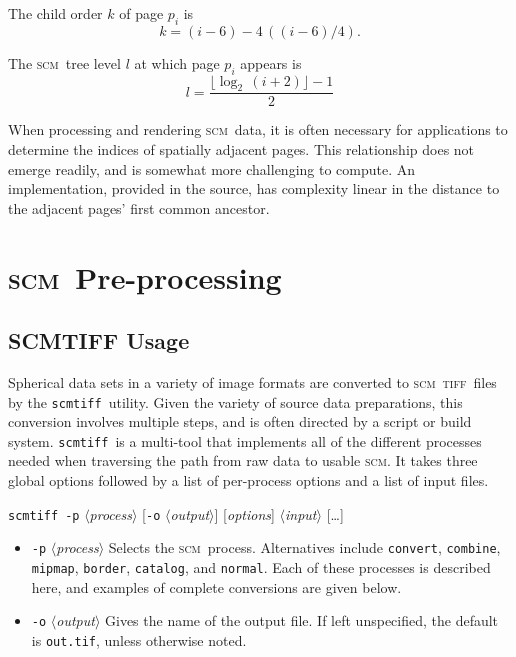 \documentclass[oneside,11pt]{memoir}
\newcommand{\scm}     {\textsc{scm}}
\newcommand{\tiff}    {\textsc{tiff}}
\newcommand{\scmtiff} {\texttt{scmtiff}}
\newcommand{\inangles}[1]{$\langle$#1$\rangle$}
\newenvironment{optionlist}
  {\setlength{\leftmargini}{1in}\begin{itemize}}{\end{itemize}}
\begin{document}
\begin{Spacing}{1.1}
The child order $k$ of page $p_i$ is
\[k=(i-6)-4\,((i-6)/4).\]

The \scm\ tree level $l$ at which page $p_i$ appears is
\[l=\frac{\lfloor\log_2\,(i+2)\rfloor - 1}{2}\]

When processing and rendering \scm\ data, it is often necessary for applications to determine the indices of spatially adjacent pages. This relationship does not emerge readily, and is somewhat more challenging to compute. An implementation, provided in the source, has complexity linear in the distance to the adjacent pages' first common ancestor.


\chapter{\scm\ Pre-processing}

\section{SCMTIFF Usage}

Spherical data sets in a variety of image formats are converted to \scm\ \tiff\ files by the \scmtiff\ utility. Given the variety of source data preparations, this conversion involves multiple steps, and is often directed by a script or build system. \scmtiff\ is a multi-tool that implements all of the different processes needed when traversing the path from raw data to usable \scm. It takes three global options followed by a list of per-process options and a list of input files.

\bigskip\noindent\scmtiff\ \texttt{-p} \inangles{\textit{process}} [\texttt{-o} \inangles{\textit{output}}] [\textit{options}] \inangles{\textit{input}} [\ldots]

\begin{optionlist}
\item[\texttt{-p} \inangles{\textit{process}}] Selects the \scm\ process. Alternatives include \texttt{convert}, \texttt{combine}, \texttt{mipmap}, \texttt{border}, \texttt{catalog}, and \texttt{normal}. Each of these processes is described here, and examples of complete conversions are given below.

\item[\texttt{-o} \inangles{\textit{output}}] Gives the name of the output file. If left unspecified, the default is \texttt{out.tif}, unless otherwise noted.


\end{optionlist}
\end{Spacing}
\end{document}
